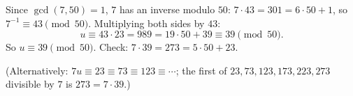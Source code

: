 Since $\gcd(7,50)=1$, $7$ has an inverse modulo $50$: $7\cdot43=301=6\cdot50+1$, so $7^{-1}\equiv43\pmod{50}$. Multiplying both sides by $43$:
\[u\equiv43\cdot23=989=19\cdot50+39\equiv39\pmod{50}.\]
So $\boxed{u\equiv39\pmod{50}}$. Check: $7\cdot39=273=5\cdot50+23$.

(Alternatively: $7u\equiv23\equiv73\equiv123\equiv\cdots$; the first of $23,73,123,173,223,273$ divisible by $7$ is $273=7\cdot39$.)
